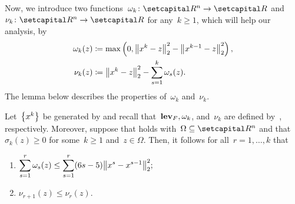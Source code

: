 \documentclass[../main]{subfiles}
\begin{document}
Now, we introduce two functions~$\omega_k \colon \setR^n \to \setR$ and~$\nu_k \colon \setR^n \to \setR$ for any~$k \ge 1$, which will help our analysis, by
\begin{align}
    \omega_k(z) &\coloneqq \max \left( 0, \norm*{x^k - z}_2^2 - \norm*{x^{k - 1} - z}_2^2 \right) \label{eq:omega}, \\
    \nu_k(z) &\coloneqq \norm*{x^k - z}_2^2 - \sum_{s = 1}^{k} \omega_s(z) \label{eq:nu}
.\end{align}
The lemma below describes the properties of~$\omega_k$ and~$\nu_k$.
\begin{lemma} 
    Let~$\set*{x^k}$ be generated by  and recall that~$\level_F, \omega_k$, and~$\nu_k$ are defined by~, respectively.
    Moreover, suppose that  holds with~$\Omega \subseteq \setR^n$ and that~$\sigma_k(z) \ge 0$ for some~$k \ge 1$ and~$z \in \Omega$.
    Then, it follows for all~$r = 1, \dots, k$ that
    \begin{enumerate}
        \item $\displaystyle \sum_{s = 1}^{r} \omega_s(z) \le \sum_{s = 1}^{r}(6s - 5) \norm*{x^s - x^{s - 1}}_2^2;$ 
        \item $\displaystyle \nu_{r + 1}(z) \le \nu_r(z).$ 
    \end{enumerate}
\end{lemma}
\end{document}
